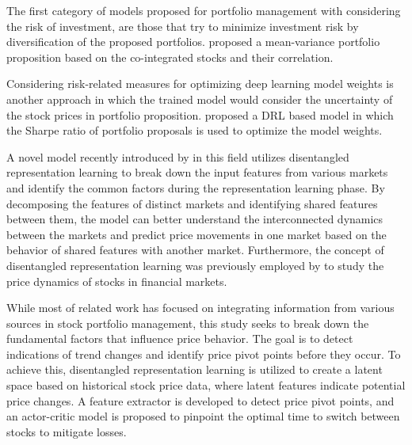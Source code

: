 The first category of models proposed for portfolio management with considering the risk of investment, are those that try to minimize investment risk by diversification of the proposed portfolios. \citet{du2022mean} proposed a mean-variance portfolio proposition based on the co-integrated stocks and their correlation. 

Considering risk-related measures for optimizing deep learning model weights is another approach in which the trained model would consider the uncertainty of the stock prices in portfolio proposition. \citet{syu2020portfolio} proposed a DRL based model in which the Sharpe ratio of portfolio proposals is used to optimize the model weights.

A novel model recently introduced by \citet{abdulsahib2024cross} in this field utilizes disentangled representation learning to break down the input features from various markets and identify the common factors during the representation learning phase. By decomposing the features of distinct markets and identifying shared features between them, the model can better understand the interconnected dynamics between the markets and predict price movements in one market based on the behavior of shared features with another market. Furthermore, the concept of disentangled representation learning was previously employed by \citet{abdulsahib2023glad} to study the price dynamics of stocks in financial markets.


While most of related work has focused on integrating information from various sources in stock portfolio management, this study seeks to break down the fundamental factors that influence price behavior. The goal is to detect indications of trend changes and identify price pivot points before they occur. To achieve this, disentangled representation learning is utilized to create a latent space based on historical stock price data, where latent features indicate potential price changes. A feature extractor is developed to detect price pivot points, and an actor-critic model is proposed to pinpoint the optimal time to switch between stocks to mitigate losses.
